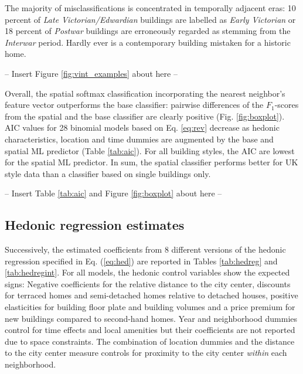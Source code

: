 \documentclass[]{article}
\begin{document}
The majority of misclassifications is concentrated in temporally
adjacent eras: 10 percent of \emph{Late Victorian/Edwardian} buildings
are labelled as \emph{Early Victorian} or 18 percent of \emph{Postwar}
buildings are erroneously regarded as stemming from the \emph{Interwar}
period. Hardly ever is a contemporary building mistaken for a historic
home.

\begin{center}
  -- Insert Figure \ref{fig:vint_examples} about here --
\end{center}

Overall, the spatial softmax classification incorporating the nearest
neighbor's feature vector outperforms the base classifier: pairwise
differences of the \(F_1\)-scores from the spatial and the base
classifier are clearly positive (Fig. \ref{fig:boxplot}). AIC values for
28 binomial models based on Eq. \ref{eq:rev} decrease as hedonic
characteristics, location and time dummies are augmented by the base and
spatial ML predictor (Table \ref{tab:aic}). For all building styles, the
AIC are lowest for the spatial ML predictor. In sum, the spatial
classifier performs better for UK style data than a classifier based on
single buildings only.

\begin{center}
  -- Insert Table \ref{tab:aic} and Figure \ref{fig:boxplot} about here --
\end{center}

\hypertarget{hedonic-regression-estimates}{%
\subsection{Hedonic regression
estimates}\label{hedonic-regression-estimates}}

Successively, the estimated coefficients from 8 different versions of
the hedonic regression specified in Eq. (\ref{eq:hed}) are reported in
Tables \ref{tab:hedreg} and \ref{tab:hedregint}. For all models, the
hedonic control variables show the expected signs: Negative coefficients
for the relative distance to the city center, discounts for terraced
homes and semi-detached homes relative to detached houses, positive
elasticities for building floor plate and building volumes and a price
premium for new buildings compared to second-hand homes. Year and
neighborhood dummies control for time effects and local amenities but
their coefficients are not reported due to space constraints. The
combination of location dummies and the distance to the city center
measure controls for proximity to the city center \emph{within} each
neighborhood.
\end{document}
